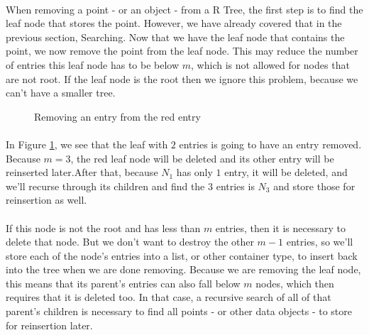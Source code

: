 \documentclass{article}
\begin{document}
\paragraph{}
When removing a point - or an object - from a R Tree, the first step is to find the leaf node that stores the point.
However, we have already covered that in the previous section, Searching. Now that we have the leaf node that contains
the point, we now remove the point from the leaf node. This may reduce the number of entries this leaf node has to be below
$m$, which is not allowed for nodes that are not root. If the leaf node is the root then we ignore this problem, because
we can't have a smaller tree.\\
\begin{figure}
\caption{Removing an entry from the red entry}
\centering
\label{fig:removing}
\end{figure}
\paragraph{}
In Figure \ref{fig:removing}, we see that the leaf with $2$ entries is going to have an entry removed. Because $m=3$, the red leaf node will be deleted and its other entry will be reinserted later.After that, because $N_1$ has only $1$ entry, it will be deleted, and we'll recurse through its children and find the $3$ entries is $N_3$ and store those for reinsertion as well.
\paragraph{}
If this node is not the root and has less than $m$ entries, then it is necessary to delete that node. But we don't want to destroy
the other $m - 1$ entries, so we'll store each of the node's entries into a list, or other container type, to insert back into
the tree when we are done removing. Because we are removing the leaf node, this means that its parent's entries can also fall below
$m$ nodes, which then requires that it is deleted too. In that case, a recursive search of all of that parent's children is necessary
to find all points - or other data objects - to store for reinsertion later.
\end{document}
